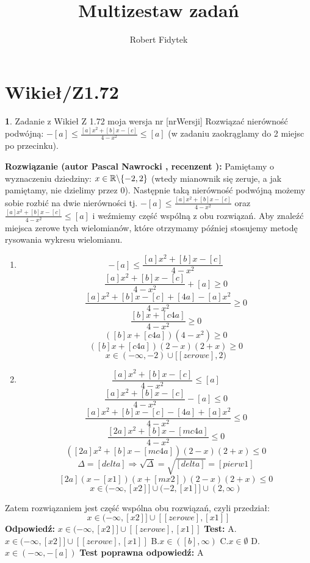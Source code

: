 \documentclass[12pt, a4paper]{article}
\title{Multizestaw zadań}
\author{Robert Fidytek}
\date{}
\theoremstyle{definition} %
\newtheorem{zad}{}
\newcommand{\kategoria}[1]{\section{#1}} %
\newcommand{\zadStart}[1]{\begin{zad}#1\newline} %
\newcommand{\zadStop}{\end{zad}}   %
\newcommand{\rozwStart}[2]{\noindent \textbf{Rozwiązanie (autor #1 , recenzent #2): }\newline} %
\newcommand{\rozwStop}{\newline}                                            %
\newcommand{\odpStart}{\noindent \textbf{Odpowiedź:}\newline}    %
\newcommand{\odpStop}{\newline}                                             %
\newcommand{\testStart}{\noindent \textbf{Test:}\newline} %
\newcommand{\testStop}{\newline} %
\newcommand{\kluczStart}{\noindent \textbf{Test poprawna odpowiedź:}\newline} %
\newcommand{\kluczStop}{\newline} %
\begin{document}
\maketitle


\kategoria{Wikieł/Z1.72}
\zadStart{Zadanie z Wikieł Z 1.72 moja wersja nr [nrWersji]}
Rozwiązać nierówność podwójną: $-[a]\leq\frac{[a]x^2+[b]x-[c]}{4-x^2}\leq [a]$ (w zadaniu zaokrąglamy do 2 miejsc po przecinku).
\zadStop
\rozwStart{Pascal Nawrocki}{}
Pamiętamy o wyznaczeniu dziedziny:  $x\in\mathbb{R}\symbol{92}\{-2,2\}$ (wtedy mianownik się zeruje, a jak pamiętamy, nie dzielimy przez 0).
Następnie taką nierówność podwójną możemy sobie rozbić na dwie nierówności tj. $-[a]\leq\frac{[a]x^2+[b]x-[c]}{4-x^2}$ oraz $\frac{[a]x^2+[b]x-[c]}{4-x^2}\leq [a]$ i weźmiemy część wspólną z obu rozwiązań. Aby znaleźć miejsca zerowe tych wielomianów, które otrzymamy później stosujemy metodę rysowania wykresu wielomianu.
\begin{enumerate}
\item
$$-[a]\leq\frac{[a]x^2+[b]x-[c]}{4-x^2}$$
$$\frac{[a]x^2+[b]x-[c]}{4-x^2}+[a]\geq0$$
$$\frac{[a]x^2+[b]x-[c]+[4a]-[a]x^2}{4-x^2}\geq0$$
$$\frac{[b]x+[c4a]}{4-x^2}\geq0$$
$$([b]x+[c4a])(4-x^2)\geq0$$
$$([b]x+[c4a])(2-x)(2+x)\geq0$$
$$x\in(-\infty,-2)\cup[[zerowe],2)$$
\item
$$\frac{[a]x^2+[b]x-[c]}{4-x^2}\leq [a]$$
$$\frac{[a]x^2+[b]x-[c]}{4-x^2}-[a]\leq0$$
$$\frac{[a]x^2+[b]x-[c]-[4a]+[a]x^2}{4-x^2}\leq0$$
$$\frac{[2a]x^2+[b]x-[mc4a]}{4-x^2}\leq0$$
$$([2a]x^2+[b]x-[mc4a])(2-x)(2+x)\leq0$$
$$\Delta=[delta]\Rightarrow \sqrt{\Delta}=\sqrt{[delta]}=[pierw1]$$
$$[2a](x-[x1])(x+[mx2])(2-x)(2+x)\leq0$$
$$x\in(-\infty,[x2]]\cup(-2,[x1]]\cup(2,\infty)$$
\end{enumerate}
Zatem rozwiązaniem jest część wspólna obu rozwiązań, czyli przedział: $$x\in(-\infty,[x2]]\cup[[zerowe],[x1]]$$
\rozwStop
\odpStart
$x\in(-\infty,[x2]]\cup[[zerowe],[x1]]$
\odpStop
\testStart
A. $x\in(-\infty,[x2]]\cup[[zerowe],[x1]]$
B.$x\in([b],\infty)$
C.$x\in\emptyset$
D.$x\in(-\infty,-[a])$
\testStop
\kluczStart
A
\kluczStop
\end{document}
